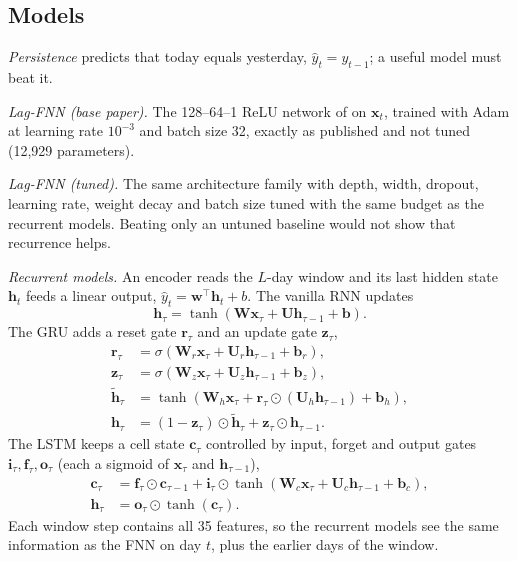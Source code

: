 \documentclass[conference]{IEEEtran}
\begin{document}
\subsection{Models}
\emph{Persistence} predicts that today equals yesterday, $\hat{y}_t=y_{t-1}$; a useful model
must beat it.

\emph{Lag-FNN (base paper).} The 128--64--1 ReLU network of \cite{long2026} on $\mathbf{x}_t$,
trained with Adam at learning rate $10^{-3}$ and batch size 32, exactly as published and not
tuned (12,929 parameters).

\emph{Lag-FNN (tuned).} The same architecture family with depth, width, dropout, learning rate,
weight decay and batch size tuned with the same budget as the recurrent models. Beating only an
untuned baseline would not show that recurrence helps.

\emph{Recurrent models.} An encoder reads the $L$-day window and its last hidden state
$\mathbf{h}_t$ feeds a linear output, $\hat{y}_t=\mathbf{w}^\top\mathbf{h}_t+b$. The vanilla
RNN \cite{elman1990} updates
\begin{equation}
\mathbf{h}_\tau=\tanh\left(\mathbf{W}\mathbf{x}_\tau+\mathbf{U}\mathbf{h}_{\tau-1}+\mathbf{b}\right).
\end{equation}
The GRU \cite{cho2014} adds a reset gate $\mathbf{r}_\tau$ and an update gate $\mathbf{z}_\tau$,
\begin{align}
\mathbf{r}_\tau&=\sigma(\mathbf{W}_r\mathbf{x}_\tau+\mathbf{U}_r\mathbf{h}_{\tau-1}+\mathbf{b}_r),\\
\mathbf{z}_\tau&=\sigma(\mathbf{W}_z\mathbf{x}_\tau+\mathbf{U}_z\mathbf{h}_{\tau-1}+\mathbf{b}_z),\\
\tilde{\mathbf{h}}_\tau&=\tanh\left(\mathbf{W}_h\mathbf{x}_\tau+\mathbf{r}_\tau\odot(\mathbf{U}_h\mathbf{h}_{\tau-1})+\mathbf{b}_h\right),\\
\mathbf{h}_\tau&=(1-\mathbf{z}_\tau)\odot\tilde{\mathbf{h}}_\tau+\mathbf{z}_\tau\odot\mathbf{h}_{\tau-1}.
\end{align}
The LSTM \cite{hochreiter1997} keeps a cell state $\mathbf{c}_\tau$ controlled by input,
forget and output gates $\mathbf{i}_\tau,\mathbf{f}_\tau,\mathbf{o}_\tau$ (each a sigmoid of
$\mathbf{x}_\tau$ and $\mathbf{h}_{\tau-1}$),
\begin{align}
\mathbf{c}_\tau&=\mathbf{f}_\tau\odot\mathbf{c}_{\tau-1}+\mathbf{i}_\tau\odot\tanh(\mathbf{W}_c\mathbf{x}_\tau+\mathbf{U}_c\mathbf{h}_{\tau-1}+\mathbf{b}_c),\\
\mathbf{h}_\tau&=\mathbf{o}_\tau\odot\tanh(\mathbf{c}_\tau).
\end{align}
Each window step contains all 35 features, so the recurrent models see the same information
as the FNN on day $t$, plus the earlier days of the window.
\end{document}
